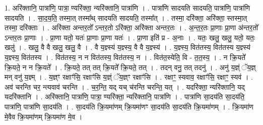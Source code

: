 \documentclass[17pt]{extarticle}
\begin{document}
1. अरि॑क्तानि॒ पात्रा॑णि॒ पात्रा॒ ण्यरि॑क्ता॒ न्यरि॑क्तानि॒ पात्रा॑णि । . पात्रा॑णि सादयति सादयति॒ पात्रा॑णि॒ पात्रा॑णि सादयति । . सा॒द॒य॒ति॒ तस्मा॒त् तस्मा᳚थ् सादयति सादयति॒ तस्मा᳚त् । . तस्मा॒ दरि॑क्ता॒ अरि॑क्ता॒ स्तस्मा॒त् तस्मा॒ दरि॑क्ताः । . अरि॑क्ता अन्तर॒तो᳚ ऽन्तर॒तो ऽरि॑क्ता॒ अरि॑क्ता अन्तर॒तः । . अ॒न्त॒र॒तः प्रा॒णाः प्रा॒णा अ॑न्तर॒तो᳚ ऽन्तर॒तः प्रा॒णाः । . प्रा॒णा यतो॒ यतः॑ प्रा॒णाः प्रा॒णा यतः॑ । . प्रा॒णा इति॑ प्र - अ॒नाः । . यतः॒ खलु॒ खलु॒ यतो॒ यतः॒ खलु॑ । . खलु॒ वै वै खलु॒ खलु॒ वै । . वै य॒ज्ञ्स्य॑ य॒ज्ञ्स्य॒ वै वै य॒ज्ञ्स्य॑ । . य॒ज्ञ्स्य॒ वित॑तस्य॒ वित॑तस्य य॒ज्ञ्स्य॑ य॒ज्ञ्स्य॒ वित॑तस्य । . वित॑तस्य॒ न न वित॑तस्य॒ वित॑तस्य॒ न । . वित॑त॒स्येति॒ वि - त॒त॒स्य॒ । . न क्रि॒यते᳚ क्रि॒यते॒ न न क्रि॒यते᳚ । . क्रि॒यते॒ तत् तत् क्रि॒यते᳚ क्रि॒यते॒ तत् । . तदन् वनु॒ तत् तदनु॑ । . अनु॑ य॒ज्ञ्ं ॅय॒ज्ञ् मन् वनु॑ य॒ज्ञ्म् । . य॒ज्ञ्ꣳ रक्षाꣳ॑सि॒ रक्षाꣳ॑सि य॒ज्ञ्ं ॅय॒ज्ञ्ꣳ रक्षाꣳ॑सि । . रक्षाꣳ॒॒ स्यवाव॒ रक्षाꣳ॑सि॒ रक्षाꣳ॒॒ स्यव॑ । . अव॑ चरन्ति चर॒ न्त्यवाव॑ चरन्ति । . च॒र॒न्ति॒ यद् यच् च॑रन्ति चरन्ति॒ यत् । . यदरि॑क्ता॒ न्यरि॑क्तानि॒ यद् यदरि॑क्तानि । . अरि॑क्तानि॒ पात्रा॑णि॒ पात्रा॒ ण्यरि॑क्ता॒ न्यरि॑क्तानि॒ पात्रा॑णि । . पात्रा॑णि सा॒दय॑ति सा॒दय॑ति॒ पात्रा॑णि॒ पात्रा॑णि सा॒दय॑ति । . सा॒दय॑ति क्रि॒यमा॑णम् क्रि॒यमा॑णꣳ सा॒दय॑ति सा॒दय॑ति क्रि॒यमा॑णम् । . क्रि॒यमा॑ण मे॒वैव क्रि॒यमा॑णम् क्रि॒यमा॑ण मे॒व । \newline
\end{document}
